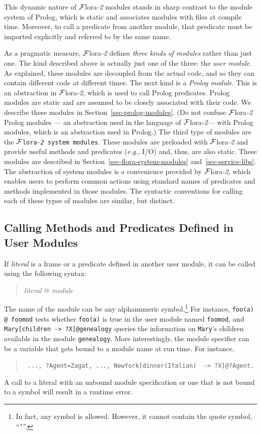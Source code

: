 \documentclass[11pt]{article}
\newcommand{\FLORA}{{\mbox{\sc ${\cal F}${lora}\rm\emph{-2}}}\xspace}
\newcommand{\FLSYSTEM}{\FLORA}
\newcommand{\mvd}{{\mbox{\tt \,->\,}}}  %
\begin{document}
This dynamic nature of \FLSYSTEM modules stands in sharp contrast to the module
system of Prolog, which is static and associates modules with files at compile
time. Moreover, to call a predicate from another module, that predicate
must be imported explicitly and referred to by the same name.

As a pragmatic measure, \FLSYSTEM defines \emph{three kinds of modules} rather
than just one. The kind described above is actually just one of the three:
the \emph{user module}. As explained, these modules are decoupled from the
actual code, and so they can contain different code at different times.
The next kind is a \emph{Prolog module}. This is an abstraction in \FLSYSTEM,
which is used to call Prolog predicates. Prolog modules are static and are
assumed to be closely associated with their code. We describe these modules
in Section~\ref{sec-prolog-modules}. (Do not confuse \FLSYSTEM Prolog modules
--- an abstraction used in the language of \FLSYSTEM --- with Prolog modules,
which is an abstraction used in Prolog.)  The third type of modules are the
{\tt \FLSYSTEM system modules}. These modules are preloaded with \FLSYSTEM
and provide useful methods and predicates ({\it e.g.}, I/O) and,
thus, are also static. These modules are described in
Section~\ref{sec-flora-system-modules} and~\ref{sec-service-libs}. The
abstraction of system modules is a convenience provided by \FLSYSTEM, which
enables users to perform common actions using standard names of
predicates and methods implemented in those modules. The syntactic
conventions for calling each of these types of modules are similar, but
distinct.


\subsection{Calling Methods and Predicates Defined in User Modules}


%
If \emph{literal} is a frame or a predicate defined in another
user module, it can be called using the following syntax:
\begin{quote}
\emph{literal} @ \emph{module} 
\end{quote}
The name of the module can be any alphanumeric symbol.\footnote{
  In fact, any symbol is allowed. However, it cannot contain the quote
  symbol, ``{\tt '}''.
  }
For instance, \verb|foo(a) @ foomod| tests whether {\tt foo(a)} is true in
the user module named {\tt foomod}, and {\tt Mary[children\mvd ?X]@genealogy}
queries the information on {\tt Mary}'s children available in the module
{\tt genealogy}. More interestingly, the module specifier can be a variable
that gets bound to a module name at run time. For instance, 
\begin{quote}
 {\tt
   ..., ?Agent=Zagat, ..., NewYork[dinner(Italian) \mvd ?X]@?Agent.
   }
\end{quote}
A call to a literal with an unbound module specification or one that is not
bound to a symbol will result in a runtime error.
\end{document}
